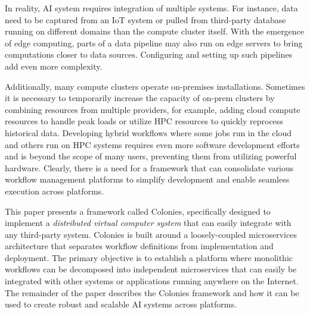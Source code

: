 \documentclass{article}
\begin{document}
In reality, AI system requires integration of multiple systems. For instance, data need to be captured from an IoT system or pulled from third-party database running on different domains than the compute cluster itself. With the emergence of edge computing, parts of a data pipeline may also run on edge servers to bring computations closer to data sources. Configuring and setting up such pipelines add even more complexity. 

Additionally, many compute clusters operate on-premises installations. Sometimes it is necessary to temporarily increase the capacity of on-prem clusters by combining resources from multiple providers, for example, adding cloud compute resources to handle peak loads or utilize HPC resources to quickly reprocess historical data. Developing hybrid workflows where some jobs run in the cloud and others run on HPC systems requires even more software development efforts \cite{wf_challenges} and is beyond the scope of many users, preventing them from utilizing powerful hardware. Clearly, there is a need for a framework that can consolidate various workflow management platforms to simplify development and enable seamless execution across platforms.

This paper presents a framework called Colonies, specifically designed to implement a \emph{distributed virtual computer system} that can easily integrate with any third-party system. Colonies is built around a loosely-coupled microservices architecture that separates workflow definitions from implementation and deployment. The primary objective is to establish a platform where monolithic workflows can be decomposed into independent microservices that can easily be integrated with other systems or applications running anywhere on the Internet. The remainder of the paper describes the Colonies framework and how it can be used to create robust and scalable AI systems across platforms. 
\end{document}
